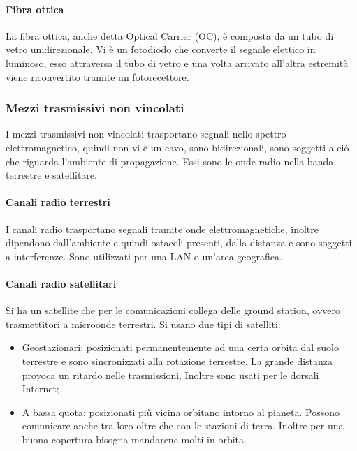 \documentclass{subfiles}
\begin{document}
    \paragraph{Fibra ottica}
    La fibra ottica, anche detta Optical Carrier (OC), è composta da un tubo di vetro unidirezionale. Vi è un fotodiodo che converte 
    il segnale elettico in luminoso, esso attraversa il tubo di vetro e una volta arrivato all'altra estremità viene riconvertito 
    tramite un fotorecettore.

\subsubsection{Mezzi trasmissivi non vincolati}
    I mezzi trasmissivi non vincolati trasportano segnali nello spettro elettromagnetico, quindi non vi è un cavo, sono bidirezionali, 
    sono soggetti a ciò che riguarda l'ambiente di propagazione. Essi sono le onde radio nella banda terrestre e satellitare.

    \paragraph{Canali radio terrestri}
    I canali radio trasportano segnali tramite onde elettromagnetiche, inoltre dipendono dall'ambiente e quindi ostacoli presenti, 
    dalla distanza e sono soggetti a interferenze. Sono utilizzati per una LAN o un'area geografica.

    \paragraph{Canali radio satellitari}
    Si ha un satellite che per le comunicazioni collega delle ground station, ovvero trasmettitori a microonde terrestri. Si usano due 
    tipi di satelliti:
    \begin{itemize}
        \item Geostazionari: posizionati permanentemente ad una certa orbita dal suolo terrestre e sono sincronizzati alla rotazione 
        terrestre. La grande distanza provoca un ritardo nelle trasmissioni. Inoltre sono usati per le dorsali Internet;
        \item A bassa quota: posizionati più vicina orbitano intorno al pianeta. Possono comunicare anche tra loro oltre che con le 
        stazioni di terra. Inoltre per una buona copertura bisogna mandarene molti in orbita.
    \end{itemize}

    
\end{document}
